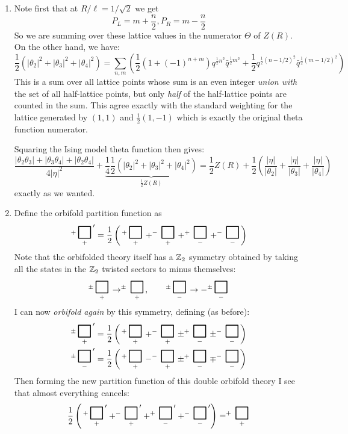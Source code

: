 \documentclass[11pt]{article}
\begin{document}
\begin{enumerate}
	\item Note first that at $R/\ell = 1/\sqrt{2}$ we get \[
		P_L = m + \frac{n}{2}, P_R = m - \frac{n}{2}
	\]
	So we are summing over these lattice values in the numerator $\Theta$ of $Z(R)$. On the other hand, we have:
	\[
		\frac12(|\theta_2|^2 + |\theta_3|^2 + |\theta_4|^2) = \sum_{n, m} \left( \frac12 (1 + (-1)^{n+m}) q^{\frac12 n^2} \bar q^{\frac12 m^2} + \frac12 q^{\frac12 (n-1/2)^2} \bar q^{\frac12 (m-1/2)^2}  \right)
	\]
	This is a sum over all lattice points whose sum is an even integer \emph{union with} the set of all half-lattice points, but only \emph{half} of the half-lattice points are counted in the sum. This agree exactly with the standard weighting for the lattice generated by $(1, 1)$ and $\frac12 (1, -1)$ which is exactly the original theta function numerator. 
	
	Squaring the Ising model theta function then gives:
	\[
		\frac{|\theta_2 \theta_3| + |\theta_3 \theta_4| + |\theta_2 \theta_4|}{4|\eta|^2} + \underbrace{\frac14 \frac12(|\theta_2|^2 + |\theta_3|^2 + |\theta_4|^2)}_{\frac12 Z(R)} = \frac12 Z(R) + \frac12 \left(\frac{|\eta|}{|\theta_2|} + \frac{|\eta|}{|\theta_3|} + \frac{|\eta|}{|\theta_4|} \right)
	\]
	exactly as we wanted. 
	
	\item Define the orbifold partition function as
	\[
		^+\underset{+}{\BoxPlz}' = \frac12 \left( \,^+\underset{+}{\BoxPlz} + ^-\underset{+}{\BoxPlz} + ^+\underset{-}{\BoxPlz} + ^-\underset{-}{\BoxPlz} \right)
	\]
	Note that the orbifolded theory itself has a $\mathbb{Z}_2$ symmetry obtained by taking all the states in the $\mathbb{Z}_2$ twisted sectors to minus themselves:
	\[
		^\pm\underset{+}{\BoxPlz} \to ^\pm\underset{+}{\BoxPlz}, \qquad ^\pm\underset{-}{\BoxPlz} \to - ^\pm\underset{-}{\BoxPlz}
	\]
	I can now \emph{orbifold again} by this symmetry, defining (as before):
	\[
	\begin{aligned}
		&^\pm\underset{+}{\BoxPlz}' = \frac12 \left( \,^+\underset{+}{\BoxPlz} + ^-\underset{+}{\BoxPlz} \pm ^+\underset{-}{\BoxPlz} \pm ^-\underset{-}{\BoxPlz} \right)\\
		& ^\pm\underset{-}{\BoxPlz}' = \frac12 \left( \,^+\underset{+}{\BoxPlz} - ^-\underset{+}{\BoxPlz} \pm ^+\underset{-}{\BoxPlz} \mp ^-\underset{-}{\BoxPlz} \right)
	\end{aligned}
	\]
	Then forming the new partition function of this double orbifold theory I see that almost everything cancels:
	\[
		\frac12 \left( \,^+\underset{+}{\BoxPlz}' + ^-\underset{+}{\BoxPlz}' + ^+\underset{-}{\BoxPlz}' + ^-\underset{-}{\BoxPlz}' \right) = ^+\underset{+}{\BoxPlz}
	\]


\end{enumerate}
\end{document}
